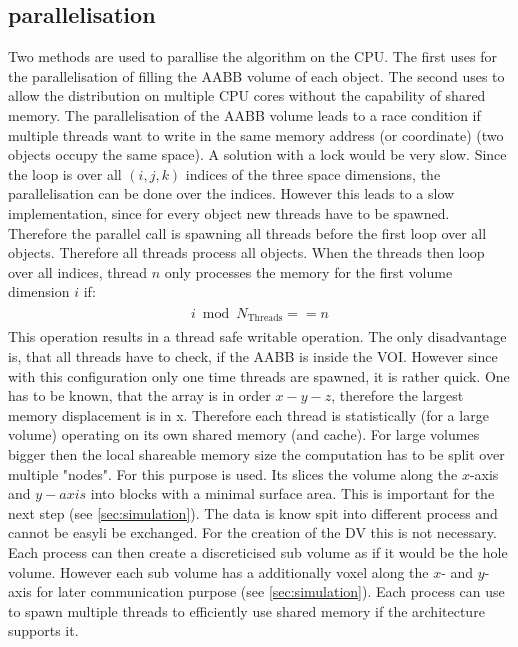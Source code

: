 \subsection{parallelisation}
% 
Two methods are used to parallise the algorithm on the \ac{CPU}.
The first uses \openmp for the parallelisation of filling the \ac{AABB} volume of each object.
The second uses \mpi to allow the distribution on multiple \ac{CPU} cores without the capability of shared memory. 
% 
The parallelisation of the \ac{AABB} volume leads to a race condition if multiple threads want to write in the same memory address (or coordinate) (\eg two objects occupy the same space).
A solution with a lock would be very slow.
Since the loop is over all $(i,j,k)$ indices of the three space dimensions, the parallelisation can be done over the indices.
However this leads to a slow implementation, since for every object new threads have to be spawned.
Therefore the parallel call is spawning all threads before the first loop over all objects.
Therefore all threads process all objects.
When the threads then loop over all indices, thread $n$ only processes the memory for the first volume dimension $i$ if:
\begin{align}
\begin{split}
    i \bmod N_{\text{Threads}} == n
\end{split}
\end{align}
% 
This operation results in a thread safe writable operation.
The only disadvantage is, that all threads have to check, if the \ac{AABB} is inside the \ac{VOI}.
However since with this configuration only one time threads are spawned, it is rather quick.
One has to be known, that the array is in order $x-y-z$, therefore the largest memory displacement is in x.
Therefore each thread is statistically (for a large volume) operating on its own shared memory (and cache).
% 
For large volumes bigger then the local shareable memory size the computation has to be split over multiple "nodes".
For this purpose \mpi is used.
Its slices the volume along the $x$-axis and $y-axis$ into blocks with a minimal surface area.
This is important for the next step (see \cref{sec:simulation}).
The data is know spit into different process and cannot be easyli be exchanged.
For the creation of the DV this is not necessary.
Each \mpi process can then create a discreticised sub volume as if it would be the hole volume.
However each sub volume has a additionally voxel along the $x$- and $y$-axis for later communication purpose (see \cref{sec:simulation}).
Each \mpi process can use \openmp to spawn multiple threads to efficiently use shared memory if the architecture supports it.
% 
% 
% 
